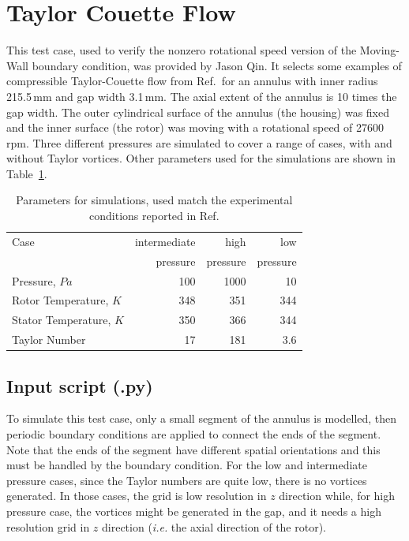 
\section{Taylor Couette Flow}
\label{taylor-couette}
%
This test case, used to verify the nonzero rotational speed version of the Moving-Wall boundary condition,
was provided by Jason Qin. 
It selects some examples of compressible Taylor-Couette flow from Ref.\,\cite{larignon_etal_2006a} 
for an annulus with inner radius 215.5\,mm and gap width 3.1\,mm.
The axial extent of the annulus is 10 times the gap width.
The outer cylindrical surface of the annulus (the housing) was fixed and 
the inner surface (the rotor) was moving with a rotational speed of 27600\,rpm.
Three different pressures are simulated to cover a range of cases, with and without Taylor vortices. 
Other parameters used for the simulations are shown in Table~\ref{ex_data}.

\begin{table}[ht]
  \caption{Parameters for simulations, used match the experimental conditions 
           reported in Ref.\cite{larignon_etal_2006a}}
  \label{ex_data}
  \begin{center}
    \begin{tabular}{lrrr}
     \hline
     \hline
     Case                    & intermediate & high     & low \\ 
                             & pressure     & pressure & pressure \\ \hline
     Pressure, $Pa$          & 100          & 1000     & 10 \\
     Rotor Temperature, $K$  & 348          & 351      & 344 \\
     Stator Temperature, $K$ & 350          & 366      & 344 \\
     Taylor Number           & 17           & 181      & 3.6 \\
     \hline
     \hline
    \end{tabular}
  \end{center}
\end{table}

\bigskip
\subsection{Input script (.py)}
%
To simulate this test case, only a small segment of the annulus is modelled, 
then periodic boundary conditions are applied to connect the ends of the segment.
Note that the ends of the segment have different spatial orientations and this must
be handled by the boundary condition. 
For the low and intermediate pressure cases, since the Taylor numbers are quite low, there is no vortices generated.
In those cases, the grid is low resolution in $z$ direction while, for high pressure case, 
the vortices might be generated in the gap, and it needs a high resolution grid in $z$ direction
(\textit{i.e.} the axial direction of the rotor).

